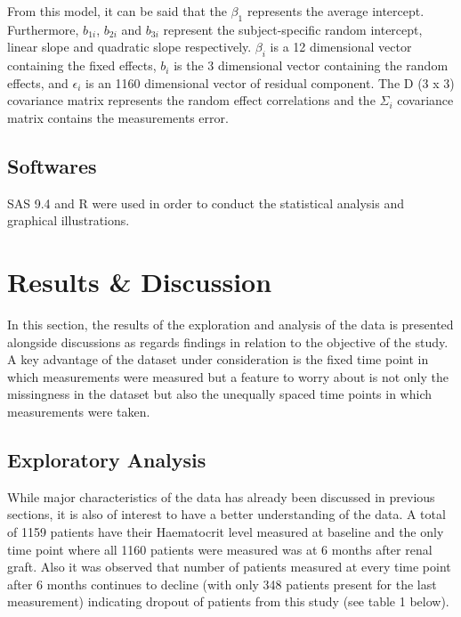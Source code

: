 \documentclass[11pt]{article}
\begin{document}
From this model, it can be said that the $\beta_{1}$ represents the average intercept. Furthermore, $b_{1i}$, $b_{2i}$ and $b_{3i}$ represent the subject-specific random intercept, linear slope and quadratic slope respectively. $\beta_{i}$ is a 12 dimensional vector containing the fixed effects, $b_{i}$ is the 3 dimensional vector containing the random effects, and $\epsilon_{i}$ is an 1160 dimensional vector of residual component. The D (3 x 3) covariance matrix represents the random effect correlations and the $\Sigma_{i}$ covariance matrix contains the measurements error.

\subsection{Softwares}
SAS 9.4\cite{bib7} and R\cite{bib6} were used in order to conduct the statistical analysis and graphical illustrations.

\section{Results \& Discussion}
In this section, the results of the exploration and analysis of the data is presented alongside discussions as regards findings in relation to the objective of the study. A key advantage of the dataset under consideration is the fixed time point in which measurements were measured but a feature to worry about is not only the missingness in the dataset but also the unequally spaced time points in which measurements were taken. 

\subsection{Exploratory Analysis}
While major characteristics of the data has already been discussed in previous sections, it is also of interest to have a better understanding of the data. A total of 1159 patients have their Haematocrit level measured at baseline and the only time point where all 1160 patients were measured was at 6 months after renal graft. Also it was observed that number of patients measured at every time point after 6 months continues to decline (with only 348 patients present for the last measurement) indicating dropout of patients from this study (see table 1 below). 
\end{document}
